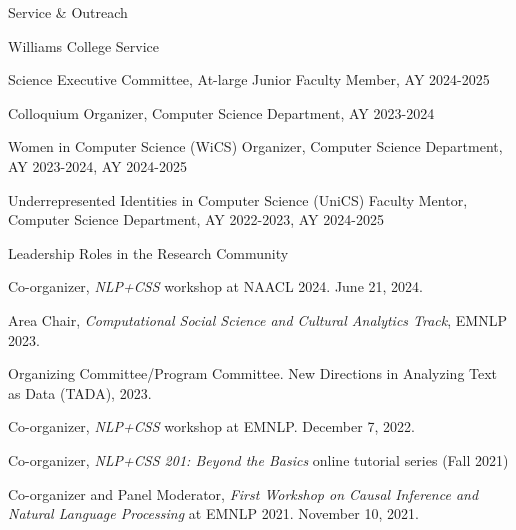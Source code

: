 \documentclass{resume} %
\begin{document}

\begin{rSection}{Service \& Outreach}

\begin{rSubsection}{Williams College Service}{}{}{}
\item Science Executive Committee, At-large Junior Faculty Member, AY 2024-2025
\item Colloquium Organizer, Computer Science Department, AY 2023-2024
\item Women in Computer Science (WiCS) Organizer, Computer Science Department, AY 2023-2024, AY 2024-2025
\item Underrepresented Identities in Computer Science (UniCS) Faculty Mentor, Computer Science Department, AY 2022-2023, AY 2024-2025
\end{rSubsection}

\begin{rSubsection}{Leadership Roles in the Research Community}{}{}{}
\item Co-organizer, \emph{NLP+CSS} workshop at NAACL 2024.  June 21, 2024.
\item Area Chair, \emph{Computational Social Science and Cultural Analytics Track}, EMNLP 2023.
\item Organizing Committee/Program Committee. New Directions in Analyzing Text as Data (TADA), 2023.
\item Co-organizer, \emph{NLP+CSS} workshop at EMNLP. December 7, 2022. 
\item Co-organizer, \emph{NLP+CSS 201: Beyond the Basics} online tutorial series (Fall 2021)
\item Co-organizer and Panel Moderator, \emph{First Workshop on Causal Inference and Natural Language Processing} at EMNLP 2021. November 10, 2021.
\end{rSubsection}


\end{rSection}
\end{document}
